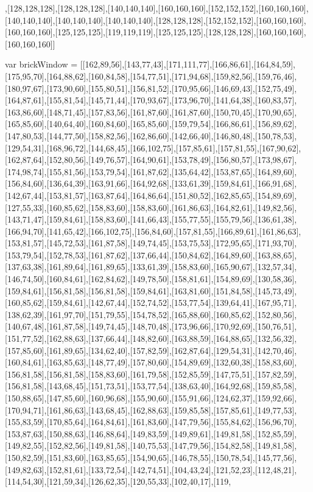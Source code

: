 ,[128,128,128],[128,128,128],[140,140,140],[160,160,160],[152,152,152],[160,160,160],[140,140,140],[140,140,140],[140,140,140],[128,128,128],[152,152,152],[160,160,160],[160,160,160],[125,125,125],[119,119,119],[125,125,125],[128,128,128],[160,160,160],[160,160,160]]

var brickWindow = [[162,89,56],[143,77,43],[171,111,77],[166,86,61],[164,84,59],[175,95,70],[164,88,62],[160,84,58],[154,77,51],[171,94,68],[159,82,56],[159,76,46],[180,97,67],[173,90,60],[155,80,51],[156,81,52],[170,95,66],[146,69,43],[152,75,49],[164,87,61],[155,81,54],[145,71,44],[170,93,67],[173,96,70],[141,64,38],[160,83,57],[163,86,60],[148,71,45],[157,83,56],[161,87,60],[161,87,60],[150,70,45],[170,90,65],[165,85,60],[140,64,40],[160,84,60],[165,85,60],[159,79,54],[166,86,61],[156,89,62],[147,80,53],[144,77,50],[158,82,56],[162,86,60],[142,66,40],[146,80,48],[150,78,53],[129,54,31],[168,96,72],[144,68,45],[166,102,75],[157,85,61],[157,81,55],[167,90,62],[162,87,64],[152,80,56],[149,76,57],[164,90,61],[153,78,49],[156,80,57],[173,98,67],[174,98,74],[155,81,56],[153,79,54],[161,87,62],[135,64,42],[153,87,65],[164,89,60],[156,84,60],[136,64,39],[163,91,66],[164,92,68],[133,61,39],[159,84,61],[166,91,68],[142,67,44],[153,81,57],[163,87,64],[164,86,64],[151,80,52],[162,85,65],[154,89,69],[127,55,33],[160,85,62],[158,83,60],[158,83,60],[161,86,63],[164,82,61],[149,82,56],[143,71,47],[159,84,61],[158,83,60],[141,66,43],[155,77,55],[155,79,56],[136,61,38],[166,94,70],[141,65,42],[166,102,75],[156,84,60],[157,81,55],[166,89,61],[161,86,63],[153,81,57],[145,72,53],[161,87,58],[149,74,45],[153,75,53],[172,95,65],[171,93,70],[153,79,54],[152,78,53],[161,87,62],[137,66,44],[150,84,62],[164,89,60],[163,88,65],[137,63,38],[161,89,64],[161,89,65],[133,61,39],[158,83,60],[165,90,67],[132,57,34],[146,74,50],[160,84,61],[162,84,62],[149,78,50],[158,81,61],[154,89,69],[130,58,36],[159,84,61],[156,81,58],[156,81,58],[159,84,61],[163,81,60],[151,84,58],[145,73,49],[160,85,62],[159,84,61],[142,67,44],[152,74,52],[153,77,54],[139,64,41],[167,95,71],[138,62,39],[161,97,70],[151,79,55],[154,78,52],[165,88,60],[160,85,62],[152,80,56],[140,67,48],[161,87,58],[149,74,45],[148,70,48],[173,96,66],[170,92,69],[150,76,51],[151,77,52],[162,88,63],[137,66,44],[148,82,60],[163,88,59],[164,88,65],[132,56,32],[157,85,60],[161,89,65],[134,62,40],[157,82,59],[162,87,64],[129,54,31],[142,70,46],[160,84,61],[163,85,63],[148,77,49],[157,80,60],[154,89,69],[132,60,38],[158,83,60],[156,81,58],[156,81,58],[158,83,60],[161,79,58],[152,85,59],[147,75,51],[157,82,59],[156,81,58],[143,68,45],[151,73,51],[153,77,54],[138,63,40],[164,92,68],[159,85,58],[150,88,65],[147,85,60],[160,96,68],[155,90,60],[155,91,66],[124,62,37],[159,92,66],[170,94,71],[161,86,63],[143,68,45],[162,88,63],[159,85,58],[157,85,61],[149,77,53],[155,83,59],[170,85,64],[164,84,61],[161,83,60],[147,79,56],[155,84,62],[156,96,70],[153,87,63],[150,88,63],[146,88,64],[149,83,59],[149,89,61],[149,81,58],[152,85,59],[149,82,55],[152,82,56],[149,81,58],[140,75,53],[147,79,56],[154,82,58],[149,81,58],[150,82,59],[151,83,60],[163,85,65],[154,90,65],[146,78,55],[150,78,54],[145,77,56],[149,82,63],[152,81,61],[133,72,54],[142,74,51],[104,43,24],[121,52,23],[112,48,21],[114,54,30],[121,59,34],[126,62,35],[120,55,33],[102,40,17],[119,